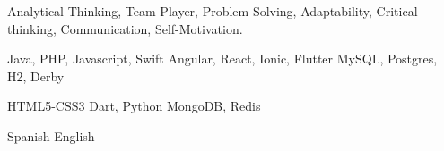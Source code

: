 
\begin{cvparagraph}
Analytical Thinking, Team Player, Problem Solving, Adaptability, Critical thinking, Communication, Self-Motivation.
\end{cvparagraph}

\begin{multicols}{3}
  \begin{cvskills}
    \cvskill
      {Java, PHP, Javascript, Swift} %
      {\faStar\faStar\faStar\faStar\faStarHalfEmpty} %
    \cvskill
      {Angular, React, Ionic, Flutter} %
      {\faStar\faStar\faStar\faStar\faStarHalfEmpty} %
    \cvskill
      {MySQL, Postgres, H2, Derby} %
      {\faStar\faStar\faStar\faStar\faStarHalfEmpty} %
  \end{cvskills}

  \columnbreak

  \begin{cvskills}
    \cvskill
      {HTML5-CSS3} %
      {\faStar\faStar\faStar\faStarHalfEmpty\faStarO} %
    \cvskill
      {{\hphantom{Empty}} Dart, Python} %
      {\faStar\faStar\faStar\faStarHalfEmpty\faStarO} %
    \cvskill
      {MongoDB, Redis} %
      {\faStar\faStar\faStar\faStarHalfEmpty\faStarO} %
  \end{cvskills}

  \columnbreak

  \begin{cvskills}
    \cvskill
      {Spanish} %
      {\faStar\faStar\faStar\faStar\faStar} %
    \cvskill
      {English} %
      {\faStar\faStar\faStar\faStarHalfEmpty\faStarO} %
  \end{cvskills}
\end{multicols}
